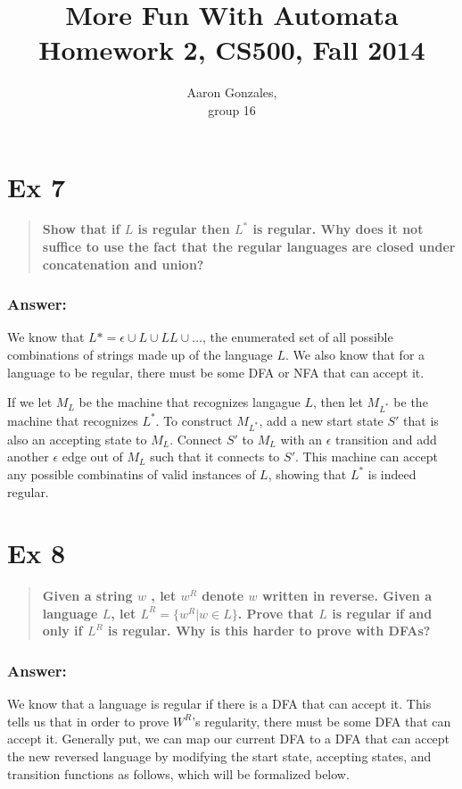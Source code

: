 \documentclass[titlepage]{article}\usepackage[]{graphicx}\usepackage[]{color}
\begin{document}
\title{More Fun With Automata \\ Homework 2, CS500, Fall 2014}
\author{Aaron Gonzales, \\ group 16}
\maketitle


\section*{Ex 7}
\begin{quote}
  \textbf{Show that if $L$ is regular then $L^*$ is regular. Why does it not suffice
  to use the fact that the regular languages are closed under concatenation and
  union?}
\end{quote}
\subsubsection*{Answer:}
We know that $L* = \epsilon \cup L \cup LL \cup \dots$, the enumerated set of
all possible combinations of strings made up of the language $L$. We also know
that for a language to be regular, there must be some DFA or NFA that can
accept it. 

If we let $M_L$ be the machine that recognizes langague $L$, then let $M_{L^*}$
be the machine that recognizes $L^*$. To construct $M_{L^*}$, add a new start
state $S'$ that is also an accepting state to $M_L$. Connect $S'$ to $M_L$ with
an $\epsilon$ transition and add another $\epsilon$ edge out of $M_L$ such that
it connects to $S'$. This machine can accept any possible combinatins of valid
instances of $L$, showing that $L^*$ is indeed regular. 



\section*{Ex 8}
\begin{quote}
  \textbf{Given a string $w$ , let $w^R$ denote $w$ written in reverse.
    Given a language $L$, let $L^R = \{w^R | w \in L \}$. Prove that $L$ is regular if and
    only if $L^R$ is regular. Why is this harder to prove with DFAs?}
\end{quote}
\subsubsection{Answer:}
We know that a language is regular if there is a DFA that can accept it. This
tells us that in order to prove $W^R$'s regularity, there must be some DFA that
can accept it. Generally put, we can map our current DFA to a DFA that can
accept the new reversed language by modifying the start state, accepting
states, and transition functions as follows, which will be formalized below.
\end{document}
